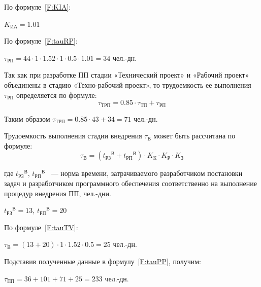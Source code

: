 По формуле~\ref{F:KIA}:

$K_{\text{ИА}} = 1.01$

По формуле~\ref{F:tauRP}:

$\tau_{\text{РП}} = 44 \cdot 1 \cdot 1.52 \cdot 1 \cdot 0.5 \cdot 1.01 = 34$ чел.-дн.

Так как при разработке ПП стадии «Технический проект» и «Рабочий проект» объединены в стадию «Техно-рабочий проект», то трудоемкость ее выполнения $\tau_{\text{РП}}$ определяется по формуле:
\begin{equation}
\tau_{\text{ТРП}} = 0.85 \cdot \tau_{\text{ТП}} + \tau_{\text{РП}}
\label{F:tauTRP}
\end{equation}

Таким образом $\tau_{\text{ТРП}} = 0.85 \cdot 43 + 34 = 71$ чел.-дн.

Трудоемкость выполнения стадии внедрения $\tau_{\text{В}}$ может быть рассчитана по формуле:
\begin{equation}
\tau_{\text{В}} = ({t_{\text{РЗ}}}^\text{В} + {t_{\text{РП}}}^\text{В}) \cdot K_{\text{К}} \cdot K_{\text{Р}} \cdot K_{\text{З}}
\label{F:tauTV}
\end{equation}

где ${t_{\text{РЗ}}}^\text{В}$, ${t_{\text{РП}}}^\text{В}$ ~--- норма времени, затрачиваемого разработчиком постановки задач и разработчиком программного обеспечения соответственно на выполнение процедур внедрения ПП, чел.-дни.

${t_{\text{РЗ}}}^\text{В} = 13$, ${t_{\text{РП}}}^\text{В} = 20$

По формуле~\ref{F:tauTV}:

$\tau_{\text{В}} = (13+20) \cdot 1 \cdot 1.52 \cdot 0.5 = 25$ чел.-дн.

Подставив полученные данные в формулу~\ref{F:tauPP}, получим:

$\tau_{\text{ПП}} = 36 + 101 + 71 + 25 = 233$ чел.-дн.

